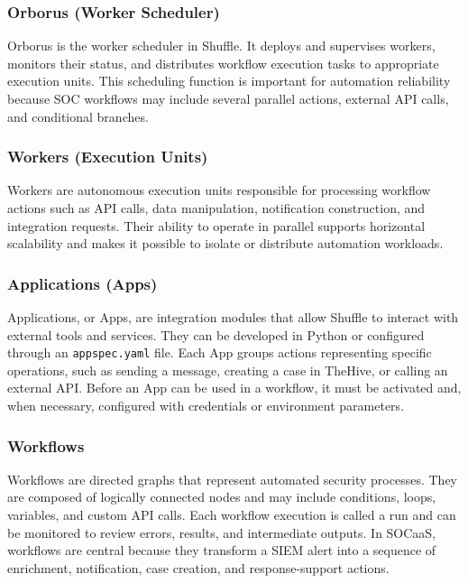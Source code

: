 \subsubsection{Orborus (Worker Scheduler)}

Orborus is the worker scheduler in Shuffle. It deploys and supervises workers, monitors their status, and distributes workflow execution tasks to appropriate execution units. This scheduling function is important for automation reliability because SOC workflows may include several parallel actions, external API calls, and conditional branches.

\subsubsection{Workers (Execution Units)}

Workers are autonomous execution units responsible for processing workflow actions such as API calls, data manipulation, notification construction, and integration requests. Their ability to operate in parallel supports horizontal scalability and makes it possible to isolate or distribute automation workloads.

\subsubsection{Applications (Apps)}

Applications, or Apps, are integration modules that allow Shuffle to interact with external tools and services. They can be developed in Python or configured through an \texttt{appspec.yaml} file. Each App groups actions representing specific operations, such as sending a message, creating a case in TheHive, or calling an external API. Before an App can be used in a workflow, it must be activated and, when necessary, configured with credentials or environment parameters.

\subsubsection{Workflows}

Workflows are directed graphs that represent automated security processes. They are composed of logically connected nodes and may include conditions, loops, variables, and custom API calls. Each workflow execution is called a run and can be monitored to review errors, results, and intermediate outputs. In SOCaaS, workflows are central because they transform a SIEM alert into a sequence of enrichment, notification, case creation, and response-support actions.

